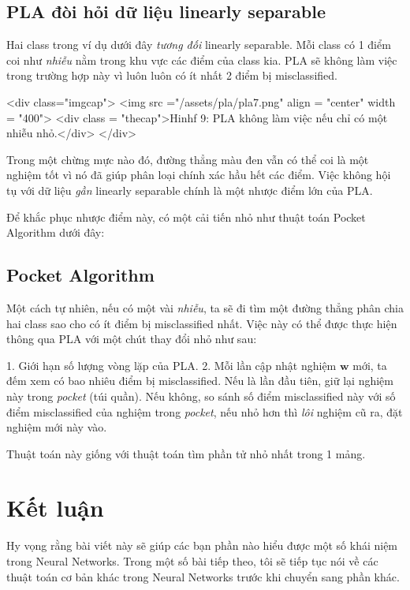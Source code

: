  
\subsection{PLA đòi hỏi dữ liệu linearly separable}
 
Hai class trong ví dụ dưới đây \textit{tương đối} linearly separable. Mỗi class có 1 điểm coi như \textit{nhiễu} nằm trong khu vực các điểm của class kia. PLA sẽ không làm việc trong trường hợp này vì luôn luôn có ít nhất 2 điểm bị misclassified.  
 
<div class="imgcap"> 
<img src ="/assets/pla/pla7.png" align = "center" width = "400"> 
<div class = "thecap">Hinhf 9: PLA không làm việc nếu chỉ có một nhiễu nhỏ.</div> 
</div>  
 
Trong một chừng mực nào đó, đường thẳng màu đen vẫn có thể coi là một nghiệm tốt vì nó đã giúp phân loại chính xác hầu hết các điểm. Việc không hội tụ với dữ liệu \textit{gần} linearly separable chính là một nhược điểm lớn của PLA. 
 
Để khắc phục nhược điểm này, có một cải tiến nhỏ như thuật toán Pocket Algorithm dưới đây: 
 
\subsection{Pocket Algorithm}
Một cách tự nhiên, nếu có một vài \textit{nhiễu}, ta sẽ đi tìm một đường thẳng phân chia hai class sao cho có ít điểm bị misclassified nhất. Việc này có thể được thực hiện thông qua PLA với một chút thay đổi nhỏ như sau: 
 
1. Giới hạn số lượng vòng lặp của PLA. 
2. Mỗi lần cập nhật nghiệm $\mathbf{w}$ mới, ta đếm xem có bao nhiêu điểm bị misclassified. Nếu là lần đầu tiên, giữ lại nghiệm này trong \textit{pocket} (túi quần). Nếu không, so sánh số điểm misclassified này với số điểm misclassified của nghiệm trong \textit{pocket}, nếu nhỏ hơn thì \textit{lôi} nghiệm cũ ra, đặt nghiệm mới này vào.  
 
Thuật toán này giống với thuật toán tìm phần tử nhỏ nhất trong 1 mảng.  
 
 
\section{Kết luận}
 
Hy vọng rằng bài viết này sẽ giúp các bạn phần nào hiểu được một số khái niệm trong Neural Networks. Trong một số bài tiếp theo, tôi sẽ tiếp tục nói về các thuật toán cơ bản khác trong Neural Networks trước khi chuyển sang phần khác.  
 
